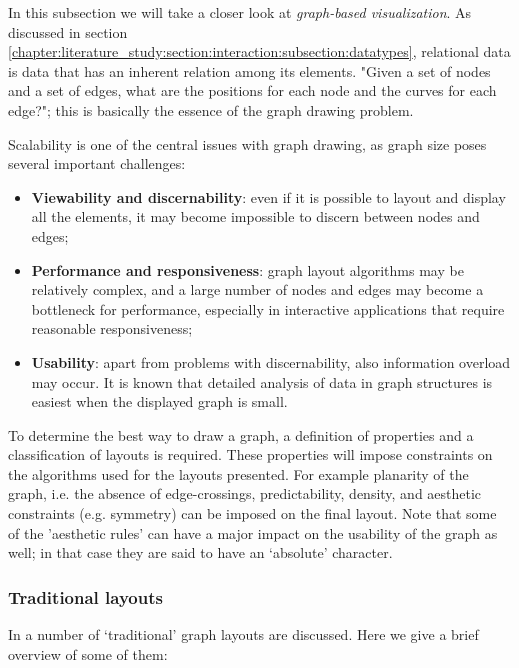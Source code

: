 In this subsection we will take a closer look at \emph{graph-based visualization}. As discussed in section \ref{chapter:literature_study:section:interaction:subsection:datatypes}, relational data is data that has an inherent relation among its elements\cite{shirley:2009}. "Given a set of nodes and a set of edges, what are the positions for each node and the curves for each edge?"; this is basically the essence of the graph drawing problem\cite{herman:2000}.

Scalability is one of the central issues with graph drawing, as graph size poses several important challenges\cite{herman:2000}:

\begin{itemize}
	\item \textbf{Viewability and discernability}: even if it is possible to layout and display all the elements, it may become impossible to discern between nodes and edges;
	\item \textbf{Performance and responsiveness}: graph layout algorithms may be relatively complex, and a large number of nodes and edges may become a bottleneck for performance, especially in interactive applications that require reasonable responsiveness;
	\item \textbf{Usability}: apart from problems with discernability, also information overload may occur. It is known that detailed analysis of data in graph structures is easiest when the displayed graph is small.
\end{itemize}

To determine the best way to draw a graph, a definition of properties and a classification of layouts is required. These properties will impose constraints on the algorithms used for the layouts presented. For example planarity of the graph, i.e. the absence of edge-crossings, predictability, density, and aesthetic constraints (e.g. symmetry) can be imposed on the final layout. Note that some of the 'aesthetic rules' can have a major impact on the usability of the graph as well; in that case they are said to have an ‘absolute’ character\cite{herman:2000}.


\subsubsection{Traditional layouts}\label{chapter:literature_study:section:interaction:subsection:graphs:subsubsection:traditional}

In \cite{herman:2000} a number of ‘traditional’ graph layouts are discussed. Here we give a brief overview of some of them:

